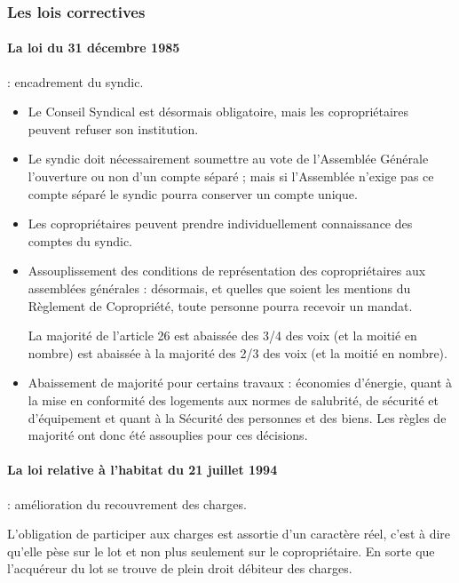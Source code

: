 			\subsubsection{Les lois correctives}
			
				\paragraph{La loi  du 31 décembre 1985} : encadrement du syndic.
				
				\begin{itemize}
					\item Le Conseil Syndical est désormais obligatoire, mais les copropriétaires peuvent refuser son institution.
					
					\item  Le syndic doit nécessairement soumettre au vote de l'Assemblée Générale l'ouverture ou non d'un compte séparé ; mais si l'Assemblée n'exige pas ce compte séparé le syndic pourra conserver un compte unique.
					
					\item  Les copropriétaires peuvent prendre individuellement connaissance des comptes du syndic.
					
					\item  Assouplissement des conditions de représentation des copropriétaires aux assemblées générales : désormais, et quelles que soient les mentions du Règlement de Copropriété, toute personne pourra recevoir un mandat.
					
					La majorité de l'article 26 est abaissée des 3/4 des voix (et la moitié en nombre) est abaissée à la majorité des 2/3 des voix (et la moitié en nombre).
					
					\item  Abaissement de majorité pour certains travaux : économies d'énergie, quant à la mise en conformité des logements aux normes de salubrité, de sécurité et d'équipement et quant à la Sécurité des personnes et des biens. Les règles de majorité ont donc été assouplies pour ces décisions.
				\end{itemize}
			
				\paragraph{La loi relative à l'habitat du 21 juillet 1994} : amélioration du recouvrement des charges.
				
				L'obligation de participer aux charges est assortie d'un caractère réel, c'est à dire qu'elle pèse sur le lot et non plus seulement sur le copropriétaire. En sorte que l'acquéreur du lot se trouve de plein droit débiteur des charges.
				

